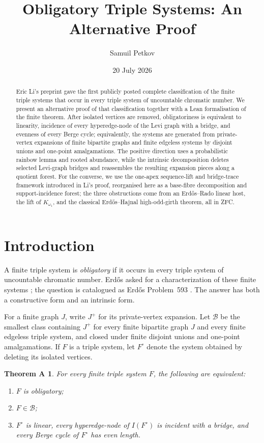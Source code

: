 \documentclass[a4paper,11pt,reqno]{amsart}
\title[Obligatory triple systems]{Obligatory Triple Systems: An Alternative Proof}
\author{Samuil Petkov}
\date{20 July 2026}
\theoremstyle{plain}
\newtheorem*{theoremA}{Theorem A}
\theoremstyle{definition}
\theoremstyle{remark}
\begin{document}
\begin{abstract}
Eric Li's preprint gave the first publicly posted complete classification of
the finite triple systems that occur in every triple system of uncountable
chromatic number.  We present
an alternative proof of that classification together with a Lean
formalisation of the finite theorem.  After isolated vertices are removed,
obligatoriness is equivalent to linearity, incidence of every hyperedge-node
of the Levi graph with a bridge, and evenness of every Berge cycle;
equivalently, the systems are generated from private-vertex expansions of
finite bipartite graphs and finite edgeless systems by disjoint unions and
one-point amalgamations.  The positive direction uses a probabilistic rainbow
lemma and rooted abundance, while the intrinsic decomposition deletes
selected Levi-graph bridges and reassembles the resulting expansion pieces
along a quotient forest.  For the converse, we use the one-apex sequence-lift
and bridge-trace framework introduced in Li's proof, reorganised here as a
base-fibre decomposition and support-incidence forest; the three obstructions
come from an Erdős--Rado linear host, the lift of $K_{\omega_1}$, and the
classical Erdős--Hajnal high-odd-girth theorem, all in ZFC.
\end{abstract}

\maketitle

\section*{Introduction}\label{introduction}

A finite triple system is \emph{obligatory} if it occurs in every triple
system of uncountable chromatic number.  Erdős asked for a characterization
of these finite systems \citep{erdos1995}; the question is catalogued as
Erdős Problem~593 \citep{bloom593}.  The answer has both a constructive form
and an intrinsic form.

For a finite graph $J$, write $J^+$ for its private-vertex expansion.  Let
$\mathcal B$ be the smallest class containing $J^+$ for every finite
bipartite graph $J$ and every finite edgeless triple system, and closed under
finite disjoint unions and one-point amalgamations.  If $F$ is a triple
system, let $F^\circ$ denote the system obtained by deleting its isolated
vertices.

\begin{theoremA}\label{theorem-a-exact-characterisation}
For every finite triple system $F$, the following are equivalent:
\begin{enumerate}
\item $F$ is obligatory;
\item $F\in\mathcal B$;
\item $F^\circ$ is linear, every hyperedge-node of $I(F^\circ)$ is incident
with a bridge, and every Berge cycle of $F^\circ$ has even length.
\end{enumerate}
\end{theoremA}
\end{document}
